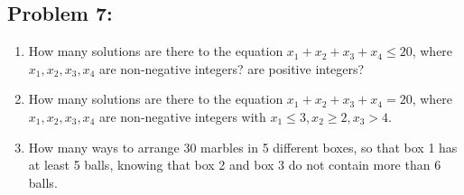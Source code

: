 \documentclass[a4paper]{article}
\begin{document}
	\subsection*{Problem 7:}
	\begin{enumerate}
		\item How many solutions are there to the equation $x_1 + x_2 + x_3 + x_4 \leq 20$, where $x_1, x_2, x_3, x_4$ are non-negative integers? are positive integers?
		\item How many solutions are there to the equation $x_1 + x_2 + x_3 + x_4 = 20$, where $x_1, x_2, x_3, x_4$ are non-negative integers with $x_1 \leq 3, x_2 \geq 2, x_3 > 4$.
		\item How many ways to arrange 30 marbles in 5 different boxes, so that box 1 has at least 5 balls, knowing that box 2 and box 3 do not contain more than 6 balls.
	\end{enumerate}
	
\end{document}
